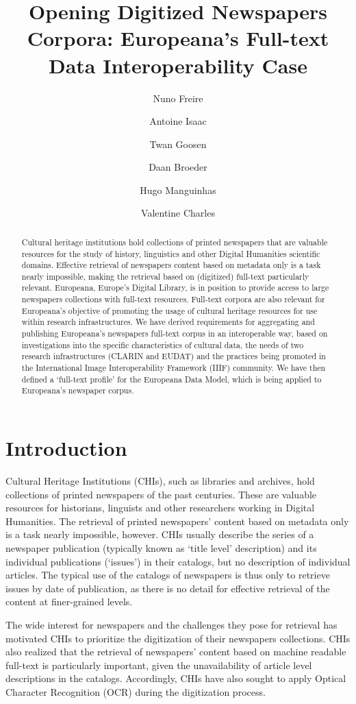 \documentclass[a4paper,UKenglish,cleveref, autoref]{oasics-v2019}
\title{Opening Digitized Newspapers Corpora: Europeana’s Full-text Data Interoperability Case} %
\author{Nuno Freire}{INESC-ID, Lisbon, Portugal}{nuno.freire@tecnico.ulisboa.pt}{https://orcid.org/0000-0002-3632-8046}{}%
\author{Antoine Isaac}{Europeana Foundation, The Hague, The Netherlands}{antoine.isaac@europeana.eu}{https://orcid.org/0000-0001-9767-6979}{}
\author{Twan Goosen}{CLARIN ERIC, Utrecht, The Netherlands}{twan@clarin.eu}{https://orcid.org/0000-0002-1634-257X}{}
\author{Daan Broeder}{KNAW Humanities Cluster, Amsterdam, The Netherlands}{daan.broeder@di.huc.knaw.nl}{https://orcid.org/0000-0002-8446-3410}{}
\author{Hugo Manguinhas}{Europeana Foundation, The Hague, The Netherlands}{hugo.manguinhas@europeana.eu}{}{}
\author{Valentine Charles}{Europeana Foundation, The Hague, The Netherlands}{valentine.charles@europeana.eu}{https://orcid.org/0000-0003-4085-5778}{}
\begin{document}
\maketitle

\begin{abstract}
Cultural heritage institutions hold collections of printed newspapers that are valuable resources for the study of history, linguistics and other Digital Humanities scientific domains. Effective retrieval of newspapers content based on metadata only is a task nearly impossible, making the retrieval based on (digitized) full-text particularly relevant. Europeana, Europe’s Digital Library, is in position to provide access to large newspapers collections with full-text resources. Full-text corpora are also relevant for Europeana’s objective of promoting the usage of cultural heritage resources for use within research infrastructures. We have derived requirements for aggregating and publishing Europeana’s newspapers full-text corpus in an interoperable way, based on investigations into the specific characteristics of cultural data, the needs of two research infrastructures (CLARIN and EUDAT) and the practices being promoted in the International Image Interoperability Framework (IIIF) community. We have then defined a `full-text profile' for the Europeana Data Model, which is being applied to Europeana’s newspaper corpus.
\end{abstract}

\section{Introduction}
\label{sec:introduction}
Cultural Heritage Institutions (CHIs), such as libraries and archives, hold collections of printed newspapers of the past centuries. These are valuable resources for historians, linguists and other researchers working in Digital Humanities. The retrieval of printed newspapers' content based on metadata only is a task nearly impossible, however. CHIs usually describe the series of a newspaper publication (typically known as `title level' description) and its individual publications (`issues') in their catalogs, but no description of individual articles. The typical use of the catalogs of newspapers is thus only to retrieve issues by date of publication, as there is no detail for effective retrieval of the content at finer-grained levels. 

The wide interest for newspapers and the challenges they pose for retrieval has motivated CHIs to prioritize the digitization of their newspapers collections. CHIs also realized that the retrieval of newspapers' content based on machine readable full-text is particularly important, given the unavailability of article level descriptions in the catalogs. Accordingly, CHIs have also sought to apply Optical Character Recognition (OCR) during the digitization process.  
\end{document}
